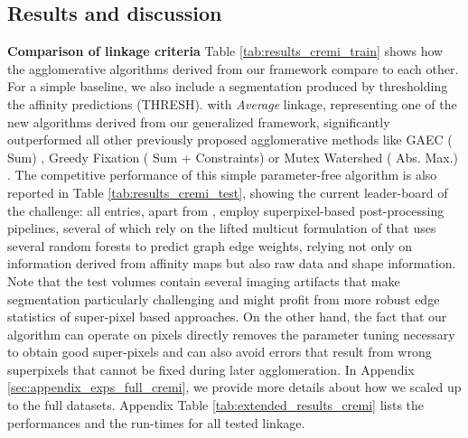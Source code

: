 

\subsection{Results and discussion}\label{sec:results}
\textbf{Comparison of linkage criteria} Table \ref{tab:results_cremi_train} shows how the agglomerative algorithms derived from our framework compare to each other. For a simple baseline, we also include a segmentation produced by thresholding the affinity predictions (THRESH).
\algname{} with \emph{Average} linkage, representing one of the new algorithms derived from our generalized framework, significantly outperformed all other previously proposed agglomerative methods like GAEC (\algname{} Sum) \cite{keuper2015efficient}, Greedy Fixation (\algname{} Sum + Constraints) \cite{levinkov2017comparative} or Mutex Watershed (\algname{} Abs. Max.) \cite{wolf2018mutex}. The competitive performance of this simple parameter-free algorithm is also reported in Table \ref{tab:results_cremi_test}, showing the current leader-board of the challenge: all entries, apart from \algname{}, employ superpixel-based post-processing pipelines, several of which rely on the lifted multicut formulation of \cite{beier2017multicut} that uses several random forests to predict graph edge weights, relying not only on information derived from affinity maps but also raw data and shape information.
Note that the test volumes contain several imaging artifacts that make segmentation particularly challenging and might profit from more robust edge statistics of super-pixel based approaches.
On the other hand, the fact that our algorithm can operate on pixels directly removes the parameter tuning necessary to obtain good super-pixels and can also avoid errors that result from wrong superpixels that cannot be fixed during later agglomeration.
In Appendix \ref{sec:appendix_exps_full_cremi}, we provide more details about how we scaled up \algname{} to the full datasets. Appendix Table \ref{tab:extended_results_cremi} lists the performances and the run-times for all tested \algname{} linkage.


